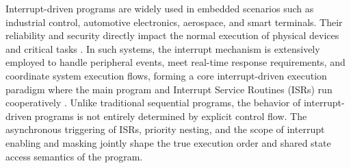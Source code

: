 \documentclass[a4paper,UKenglish,cleveref, autoref, thm-restate]{lipics-v2021}
\begin{document}


Interrupt-driven programs are widely used in embedded scenarios such as industrial control, automotive electronics, aerospace, and smart terminals. Their reliability and security directly impact the normal execution of physical devices and critical tasks \cite{martinez2014hardware, pan2019easy}. In such systems, the interrupt mechanism is extensively employed to handle peripheral events, meet real-time response requirements, and coordinate system execution flows, forming a core interrupt-driven execution paradigm where the main program and Interrupt Service Routines (ISRs) run cooperatively \cite{brylow2004deadline}. Unlike traditional sequential programs, the behavior of interrupt-driven programs is not entirely determined by explicit control flow. The asynchronous triggering of ISRs, priority nesting, and the scope of interrupt enabling and masking jointly shape the true execution order and shared state access semantics of the program.
\end{document}
